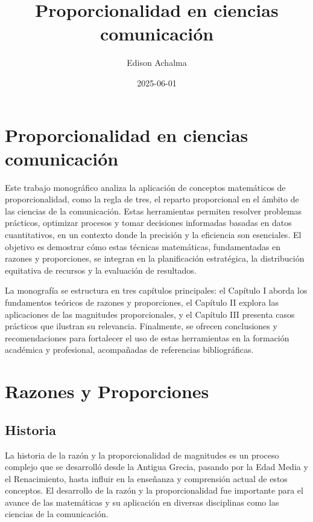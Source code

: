 \documentclass[
  stu,
  floatsintext,
  longtable,
  a4paper,
  nolmodern,
  notxfonts,
  notimes,
  12pt,
  colorlinks=true,linkcolor=blue,citecolor=blue,urlcolor=blue]{apa7}
\title{Proporcionalidad en ciencias comunicación}
\author{Edison Achalma}
\affiliation{
{Escuela Profesional de Economía, Universidad Nacional de San Cristóbal
de Huamanga}}
\date{2025-06-01}
\begin{document}
\maketitle


\hypertarget{toc}{}
\tableofcontents
\newpage
\section[Introduction]{Proporcionalidad en ciencias comunicación}

\setcounter{secnumdepth}{3}

\setlength\LTleft{0pt}




Este trabajo monográfico analiza la aplicación de conceptos matemáticos
de proporcionalidad, como la regla de tres, el reparto proporcional en
el ámbito de las ciencias de la comunicación. Estas herramientas
permiten resolver problemas prácticos, optimizar procesos y tomar
decisiones informadas basadas en datos cuantitativos, en un contexto
donde la precisión y la eficiencia son esenciales. El objetivo es
demostrar cómo estas técnicas matemáticas, fundamentadas en razones y
proporciones, se integran en la planificación estratégica, la
distribución equitativa de recursos y la evaluación de resultados.

La monografía se estructura en tres capítulos principales: el Capítulo I
aborda los fundamentos teóricos de razones y proporciones, el Capítulo
II explora las aplicaciones de las magnitudes proporcionales, y el
Capítulo III presenta casos prácticos que ilustran su relevancia.
Finalmente, se ofrecen conclusiones y recomendaciones para fortalecer el
uso de estas herramientas en la formación académica y profesional,
acompañadas de referencias bibliográficas.

\section{Razones y Proporciones}\label{razones-y-proporciones}

\subsection{Historia}\label{historia}

La historia de la razón y la proporcionalidad de magnitudes es un
proceso complejo que se desarrolló desde la Antigua Grecia, pasando por
la Edad Media y el Renacimiento, hasta influir en la enseñanza y
comprensión actual de estos conceptos. El desarrollo de la razón y la
proporcionalidad fue importante para el avance de las matemáticas y su
aplicación en diversas disciplinas como las ciencias de la comunicación.
\end{document}
